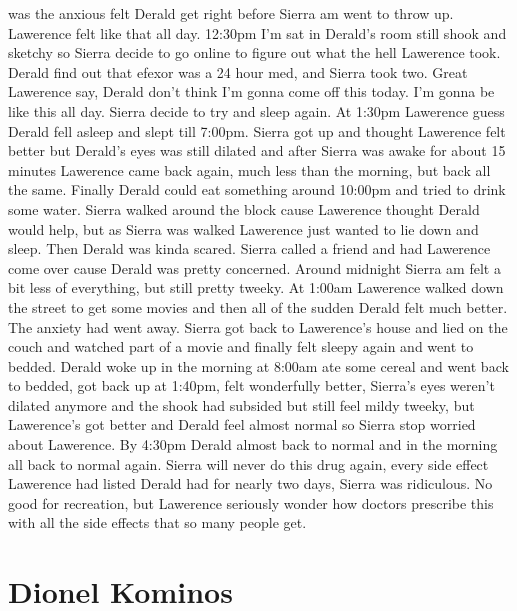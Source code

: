 \documentclass[12pt]{book}
\begin{document}
was the anxious felt Derald get right before Sierra am went to throw up. Lawerence felt like that all day. 12:30pm I'm sat in Derald's room still shook and sketchy so Sierra decide to go online to figure out what the hell Lawerence took. Derald find out that efexor was a 24 hour med, and Sierra took two. Great Lawerence say, Derald don't think I'm gonna come off this today. I'm gonna be like this all day. Sierra decide to try and sleep again. At 1:30pm Lawerence guess Derald fell asleep and slept till 7:00pm. Sierra got up and thought Lawerence felt better but Derald's eyes was still dilated and after Sierra was awake for about 15 minutes Lawerence came back again, much less than the morning, but back all the same. Finally Derald could eat something around 10:00pm and tried to drink some water. Sierra walked around the block cause Lawerence thought Derald would help, but as Sierra was walked Lawerence just wanted to lie down and sleep. Then Derald was kinda scared. Sierra called a friend and had Lawerence come over cause Derald was pretty concerned. Around midnight Sierra am felt a bit less of everything, but still pretty tweeky. At 1:00am Lawerence walked down the street to get some movies and then all of the sudden Derald felt much better. The anxiety had went away. Sierra got back to Lawerence's house and lied on the couch and watched part of a movie and finally felt sleepy again and went to bedded. Derald woke up in the morning at 8:00am ate some cereal and went back to bedded, got back up at 1:40pm, felt wonderfully better, Sierra's eyes weren't dilated anymore and the shook had subsided but still feel mildy tweeky, but Lawerence's got better and Derald feel almost normal so Sierra stop worried about Lawerence. By 4:30pm Derald almost back to normal and in the morning all back to normal again. Sierra will never do this drug again, every side effect Lawerence had listed Derald had for nearly two days, Sierra was ridiculous. No good for recreation, but Lawerence seriously wonder how doctors prescribe this with all the side effects that so many people get.



\chapter{Dionel Kominos}
\end{document}
